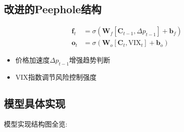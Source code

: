 \documentclass[a4paper,11pt]{ctexart}
\begin{document}
\subsection*{改进的Peephole结构}
\begin{equation*}
\begin{aligned}
\mathbf{f}_t &= \sigma\left(\mathbf{W}_f[\mathbf{C}_{t-1}, \Delta p_{t-1}] + \mathbf{b}_f\right) \\
\mathbf{o}_t &= \sigma\left(\mathbf{W}_o[\mathbf{C}_t, \text{VIX}_t] + \mathbf{b}_o\right)
\end{aligned}
\end{equation*}
\begin{itemize}
\item 价格加速度$\Delta p_{t-1}$增强趋势判断
\item VIX指数调节风险控制强度
\end{itemize}




\subsection{模型具体实现} 

模型实现结构图全览:
\end{document}
